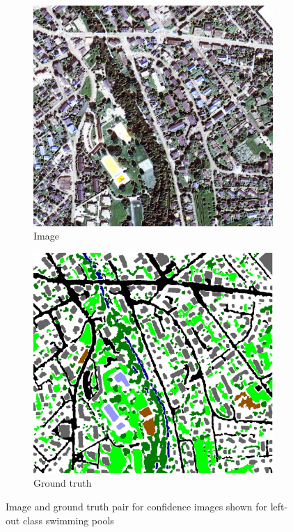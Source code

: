 \documentclass[10pt]{article}
\begin{document}
\begin{figure}[H]
	\centering
	\begin{subfigure}{.32\textwidth}
		\includegraphics[width=\textwidth]{Im_16}
		\caption{Image}
	\end{subfigure}
	\begin{subfigure}{.32\textwidth}
		\includegraphics[width=\textwidth]{GT_16}
		\caption{Ground truth}
	\end{subfigure}
	\caption{Image and ground truth pair for confidence images shown for left-out class swimming pools}
\end{figure}
\end{document}
